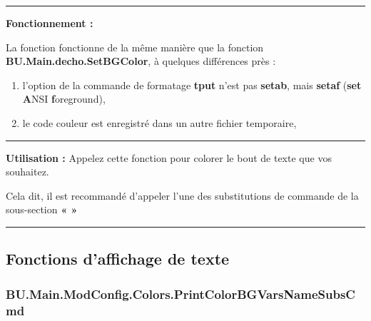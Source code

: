 \documentclass[a4paper,10pt]{article}
\begin{document}

\par\noindent\rule{\textwidth}{0.4pt}

\begin{justify}
    \textbf{Fonctionnement :}

    La fonction fonctionne de la même manière que la fonction \textbf{\color{func}BU.Main.decho.SetBGColor}, à quelques différences près :
    \begin{enumerate}
        \item l'option de la commande de formatage \textbf{\color{cmds}tput} n'est pas \textbf{setab}, mais \textbf{setaf} (\textbf{set} \textbf{A}NSI \textbf{f}oreground),
        \item le code couleur est enregistré dans un autre fichier temporaire,
    \end{enumerate}
\end{justify}




\par\noindent\rule{\textwidth}{0.4pt}

\begin{justify}
    \textbf{Utilisation :} Appelez cette fonction pour colorer le bout de texte que vos souhaitez.
\end{justify}

\begin{justify}
    Cela dit, il est recommandé d'appeler l'une des substitutions de commande de la sous-section \textbf{\color{sec2}«  »}
\end{justify}







\color{sec2}\par\noindent\rule{\textwidth}{0.4pt}\color{text}

\color{sec2}
\subsection{Fonctions d'affichage de texte}\color{text}

\color{sec3}
\subsubsection{BU.Main.ModConfig.Colors.PrintColorBGVarsNameSubsCmd}\color{text}
\end{document}
